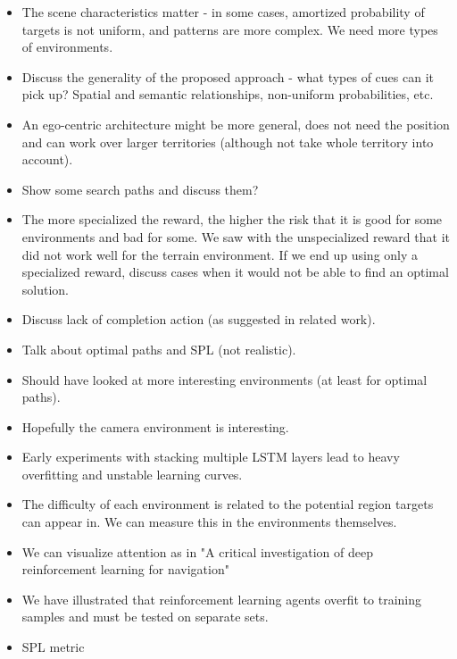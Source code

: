 \begin{itemize}
    \item The scene characteristics matter - in some cases, amortized probability of targets is not uniform, and patterns are more complex. We need more types of environments.
    \item Discuss the generality of the proposed approach - what types of cues can it pick up? Spatial and semantic relationships, non-uniform probabilities, etc. 
    \item An ego-centric architecture might be more general, does not need the position and can work over larger territories (although not take whole territory into account).
    \item Show some search paths and discuss them?
    \item The more specialized the reward, the higher the risk that it is good for some environments and bad for some. We saw with the unspecialized reward that it did not work well for the terrain environment. If we end up using only a specialized reward, discuss cases when it would not be able to find an optimal solution.
    \item Discuss lack of completion action (as suggested in related work).
    \item Talk about optimal paths and SPL (not realistic).
    \item Should have looked at more interesting environments (at least for optimal paths).
    \item Hopefully the camera environment is interesting.
    \item Early experiments with stacking multiple LSTM layers lead to heavy overfitting and unstable learning curves.
    \item The difficulty of each environment is related to the potential region targets can appear in. We can measure this in the environments themselves.
    \item We can visualize attention as in "A critical investigation of deep reinforcement learning for navigation"
    \item We have illustrated that reinforcement learning agents overfit to training samples and must be tested on separate sets.
    \item SPL metric
\end{itemize}

